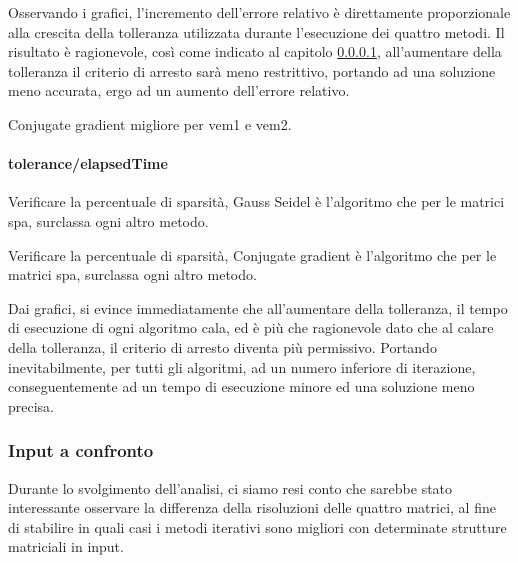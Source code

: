 Osservando i grafici, l'incremento dell'errore relativo è direttamente proporzionale alla crescita della tolleranza utilizzata durante l'esecuzione dei quattro metodi. Il risultato è ragionevole, così come indicato al capitolo \ref{tol/time, diff methods}, all'aumentare della tolleranza il criterio di arresto sarà meno restrittivo, portando ad una soluzione meno accurata, ergo ad un aumento dell'errore relativo.

Conjugate gradient migliore per vem1 e vem2.

\paragraph{tolerance/elapsedTime}\label{tol/time, diff methods}


Verificare la percentuale di sparsità, Gauss Seidel è l'algoritmo che per le matrici spa, surclassa ogni altro metodo.


Verificare la percentuale di sparsità, Conjugate gradient è l'algoritmo che per le matrici spa, surclassa ogni altro metodo.

Dai grafici, si evince immediatamente che all'aumentare della tolleranza, il tempo di esecuzione di ogni algoritmo cala, ed è più che ragionevole dato che al calare della tolleranza, il criterio di arresto diventa più permissivo.
Portando inevitabilmente, per tutti gli algoritmi, ad un numero inferiore di iterazione, conseguentemente ad un tempo di esecuzione minore ed una soluzione meno precisa.


\subsubsection{Input a confronto}
Durante lo svolgimento dell'analisi, ci siamo resi conto che sarebbe stato interessante osservare la differenza della risoluzioni delle quattro matrici, al fine di stabilire in quali casi i metodi iterativi sono migliori con determinate strutture matriciali in input.

